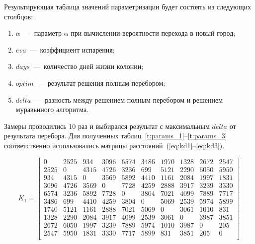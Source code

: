 Результирующая таблица значений параметризации будет состоять из следующих столбцов:
\begin{enumerate}
	\item $\alpha$~---~параметр $\alpha$ при вычислении вероятности перехода в новый город;
	\item $eva$~---~коэффициент испарения;
	\item $days$~---~количество дней жизни колонии;
	\item $optim$~---~результат решения полным перебором;
	\item $delta$~---~разность между решением полным перебором и решением муравьиного алгоритма.
\end{enumerate}
Замеры проводились 10 раз и выбирался результат с максимальным $delta$ от результата перебора.
Для полученных таблиц~\ref{t:params_1}--\ref{t:params_3} соответственно использовались матрицы расстояний~(\ref{eq:kd1}--\ref{eq:kd3}).

\begin{equation}
	\label{eq:kd1}
	K_{1} =\begin{bmatrix}
	 0 & 2525 & 934 & 3096 & 6574 & 3486 & 1970 & 1328 & 2672 & 2547 \\
		2525 & 0 & 4315 & 4726 & 3236 & 699 & 5121 & 2290 & 6050 & 5950 \\
		934 & 4315 & 0 & 3569 & 5892 & 4410 & 1161 & 2084 & 1997 & 1831 \\
		3096 & 4726 & 3569 & 0 & 7728 & 4259 & 2888 & 3917 & 3239 & 3330 \\
		6574 & 3236 & 5892 & 7728 & 0 & 3804 & 7021 & 4099 & 7889 & 7717 \\
		3486 & 699 & 4410 & 4259 & 3804 & 0 & 5069 & 2539 & 5974 & 5899 \\
		1740 & 5121 & 1161 & 2888 & 7021 & 5069 & 0 & 3061 & 1010 & 831 \\
		1328 & 2290 & 2084 & 3917 & 4099 & 2539 & 3061 & 0 & 3987 & 3851 \\
		2672 & 6050 & 1997 & 3239 & 7889 & 5974 & 1010 & 3987 & 0 & 205 \\
		2547 & 5950 & 1831 & 3330 & 7717 & 5899 & 831 & 3851 & 205 & 0 \\
	\end{bmatrix}
\end{equation}

